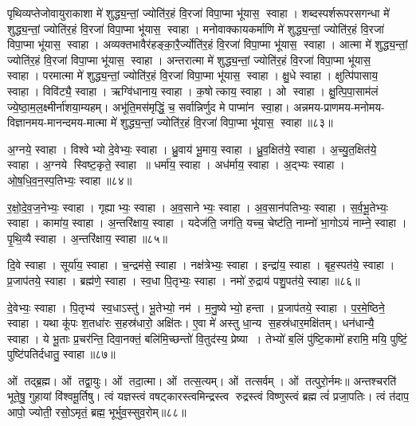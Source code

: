 पृथिव्यप्तेजोवायुराकाशा मे॑ शुद्ध्य॒न्तां॒ ज्योति॑र॒हं वि॒रजा॑ विपा॒प्मा भू॑यास॒ स्वाहा। 
शब्दस्पर्शरूपरसगन्धा  मे॑ शुद्ध्य॒न्तां॒ ज्योति॑र॒हं वि॒रजा॑ विपा॒प्मा भू॑यास॒ स्वाहा। 
मनोवाक्कायकर्माणि  मे॑ शुद्ध्य॒न्तां॒ ज्योति॑र॒हं वि॒रजा॑ विपा॒प्मा भू॑यास॒ स्वाहा। 
अव्यक्तभावैर॑हङ्का॒रै॒र्ज्योति॑र॒हं वि॒रजा॑ विपा॒प्मा भू॑यास॒ स्वाहा। 
आत्मा मे॑ शुद्ध्य॒न्तां॒ ज्योति॑र॒हं वि॒रजा॑ विपा॒प्मा भू॑यास॒ स्वाहा। 
अन्तरात्मा मे॑ शुद्ध्य॒न्तां॒ ज्योति॑र॒हं वि॒रजा॑ विपा॒प्मा भू॑यास॒ स्वाहा। 
परमात्मा  मे॑ शुद्ध्य॒न्तां॒ ज्योति॑र॒हं वि॒रजा॑ विपा॒प्मा भू॑यास॒ स्वाहा। 
क्षु॒धे स्वाहा। क्षुत्पि॑पासाय॒ स्वाहा। विवि॑ट्यै॒ स्वाहा। ऋग्वि॑धानाय॒ स्वाहा। क॒षोत्काय॒ स्वाहा। ओ स्वाहा। क्षु॒त्पि॒पा॒साम॑लं ज्ये॒ष्ठा॒म॒ल॒क्ष्मीर्ना॑शया॒म्यहम्। अभू॑ति॒मस॑मृद्धिं॒ च॒ सर्वान्निर्णुद मे पाप्मा॑न स्वा॒हा।
अन्नमय-प्राणमय-मनोमय-विज्ञानमय-मानन्दमय-मात्मा मे॑ शुद्ध्य॒न्तां॒ ज्योति॑र॒हं वि॒रजा॑ विपा॒प्मा भू॑यास॒ स्वाहा॥८३॥
\anuvakamend

अ॒ग्नये॒ स्वाहा। विश्वेभ्यो दे॒वेभ्यः॒ स्वाहा। ध्रु॒वाय॑ भू॒माय॒ स्वाहा। ध्रु॒व॒क्षित॑ये॒ स्वाहा। अ॒च्यु॒त॒क्षित॑ये॒ स्वाहा। अ॒ग्नये स्विष्ट॒कृते॒ स्वाहा ॥ धर्मा॑य॒ स्वाहा। अध॑र्माय॒ स्वाहा। अ॒द्भ्यः स्वाहा। ओ॒ष॒धि॒व॒न॒स्प॒तिभ्यः॒ स्वाहा॥८४॥ 

र॒क्षो॒दे॒व॒ज॒नेभ्यः॒ स्वाहा। गृह्याभ्यः॒ स्वाहा। अ॒व॒सानेभ्यः॒ स्वाहा। अ॒व॒सान॑पतिभ्यः॒ स्वाहा। स॒र्व॒भू॒तेभ्यः॒ स्वाहा। कामा॑य॒ स्वाहा। अ॒न्तरि॑क्षाय॒ स्वाहा। यदेज॑ति॒ जग॑ति॒ यच्च॒ चेष्ट॑ति॒ नाम्नो॑ भा॒गोऽयं नाम्ने॒ स्वाहा। पृ॒थि॒व्यै स्वाहा। अ॒न्तरि॑क्षाय॒ स्वाहा॥८५॥ 

दि॒वे स्वाहा। सूर्या॑य॒ स्वाहा। च॒न्द्रम॑से॒ स्वाहा। नक्ष॑त्रेभ्यः॒ स्वाहा। इन्द्रा॑य॒ स्वाहा। बृह॒स्पत॑ये॒ स्वाहा। प्र॒जाप॑तये॒ स्वाहा। ब्रह्म॑णे॒ स्वाहा। स्व॒धा पि॒तृभ्यः॒ स्वाहा। नमो॑ रु॒द्राय॑ पशु॒पत॑ये॒ स्वाहा॥८६॥

  दे॒वेभ्यः॒ स्वाहा। पि॒तृभ्य॑ स्व॒धाऽस्तु॑। भू॒तेभ्यो॒ नम॑। म॒नु॒ष्येभ्यो॒ हन्ता। प्र॒जाप॑तये॒ स्वाहा। प॒र॒मे॒ष्ठिने॒ स्वाहा। यथा कू॑पः श॒तधा॑रः स॒हस्र॑धारो॒ अक्षि॑तः। ए॒वा मे॑ अस्तु धा॒न्य स॒हस्र॑धार॒मक्षि॑तम्। धन॑धान्यै॒ स्वाहा। ये भू॒ताः प्र॒चर॑न्ति॒ दिवा॒नक्तं॒ बलि॑मि॒च्छन्तो॑ वि॒तुद॑स्य॒ प्रेष्या। तेभ्यो॑ ब॒लिं पु॑ष्टि॒कामो॑ हरामि॒ मयि॒ पुष्टिं॒ पुष्टि॑पतिर्दधातु॒ स्वाहा॥८७॥ \anuvakamend

ओं तद्ब्र॒ह्म। ओं तद्वा॒युः। ओं तदा॒त्मा। ओं तत्स॒त्यम्‌।
ओं तत्सर्वम्‌। ओं तत्पुरो॒र्नमः॥
अन्तश्चरति॑ भूते॒षु॒ गुहायां वि॑श्वमू॒र्तिषु। 
त्वं यज्ञस्त्वं वषट्कारस्त्वमिन्द्रस्त्व रुद्रस्त्वं विष्णुस्त्वं ब्रह्म त्वं॑ प्रजा॒पतिः।
त्वं त॑दाप॒ आपो॒ ज्योती॒ रसो॒ऽमृतं॒ ब्रह्म॒ भूर्भुव॒स्सुव॒रोम्‌॥८८॥
\anuvakamend


